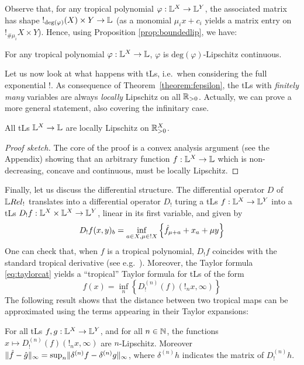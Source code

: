 Observe that, for any tropical polynomial $\varphi:\mathbb{L}^{X}\to \mathbb{L}^{Y}$, the associated matrix has shape $!_{\mathrm{deg}(\varphi)}(X)\times Y\to \mathbb{L}$ (as a monomial $\mu_ix+c_{i}$ yields a matrix entry on $!_{\#\mu_i}X\times Y$). Hence, using Proposition \ref{prop:boundedlip}, we have:
\begin{corollary}\label{prop:polylip}
For any tropical polynomial $\varphi:\mathbb{L}^{X}\to\mathbb{L}$, $\varphi$ is $\mathrm{deg}(\varphi)$-Lipschitz continuous.
\end{corollary}

Let us now look at what happens with tLs, i.e.~when considering the full exponential $!$.
As consequence of Theorem~\ref{theorem:fepsilon}, the tLs with \emph{finitely many} variables are always \emph{locally} Lipschitz on all $\mathbb{R}_{>0}$.
Actually, we can prove a more general statement, also covering the infinitary case.


\begin{theorem}\label{thmTLSlocLip}
 All tLs $\mathbb{L}^X\to\mathbb{L}$ are locally Lipschitz on $\mathbb{R}_{>0}^X$.
\end{theorem}
\begin{proof}[Proof sketch]
The core of the proof is a convex analysis argument (see the Appendix) showing that an arbitrary function $f:\mathbb{L}^X\to\mathbb{L}$ which is non-decreasing, concave and continuous, must be locally Lipschitz. 
\end{proof}


Finally, let us discuss the differential structure. The differential operator $D$ of $\LREL_{!}$ translates into a differential operator $D_{!}$ turing a tLs $f:\mathbb{L}^{X}\to \mathbb{L}^{Y}$ into a tLs $D_{!}f:\mathbb{L}^{X}\times \mathbb{L}^{X}\to \mathbb{L}^{Y}$, linear in its first variable, and given by 
\begin{equation}
D_{!}f(x,y)_{b}=\inf_{a\in X, \mu\in !X}\left\{\hat{f}_{\mu+a}+x_{a}+\mu y\right\}
\end{equation}
One can check that, when $f$ is a tropical polynomial, $D_{!}f$ coincides with the standard tropical derivative (see e.g.~\cite{Grigoriev2017}).
Moreover, the Taylor formula \eqref{eq:taylorcat} yields a ``tropical'' Taylor formula for tLs of the form 
\begin{equation}
f(x)=\inf_{n}\left\{D_{!}^{(n)}(f)(!_{n}x,\infty)\right\}
\end{equation}
The following result shows that the distance between two tropical maps can be approximated using the terms appearing in their Taylor expansions:
\begin{proposition}
For all tLs $f,g: \mathbb{L}^{X}\to \mathbb{L}^{Y}$, and for all $n\in \mathbb{N}$, 
the functions $x\mapsto D_{!}^{(n)}(f)(!_{n}x,\infty)$ are $n$-Lipschitz. Moreover 
$\lVert \hat{f}-\hat{g}\rVert_{\infty}= \sup_{n} \lVert {\delta^{(n)}f}- {\delta^{(n)}g}\rVert_{\infty}$, 
where $\delta^{(n)}h$ indicates the matrix of $D_{!}^{(n)}h$.
\end{proposition} 



